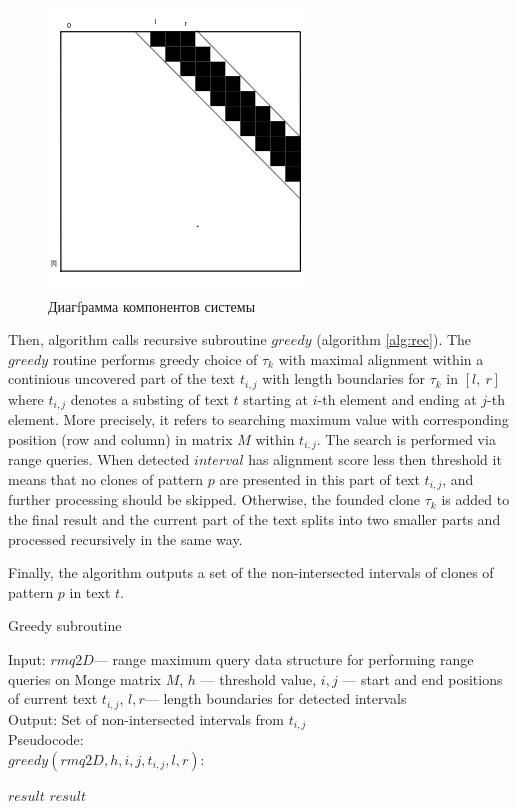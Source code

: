 \begin{figure}[H]
  \centering
    \includegraphics[width=0.4\columnwidth]{figures/M1.png}
    \caption{Диагfрамма компонентов системы}\label{figures:M2}
\end{figure}

Then, algorithm calls recursive subroutine $greedy$ (algorithm \ref{alg:rec}).
The $greedy$ routine performs greedy choice of $\tau_{k}$ with maximal alignment within a continious uncovered part of the text $t_{i,j}$ with length boundaries for $\tau_{k}$ in $[l,\ r]$ where $t_{i,j}$ denotes a substing of text $t$ starting at $i$-th element and ending at $j$-th element.
More precisely, it refers to searching maximum value with corresponding position (row and column) in matrix $M$ within $t_{i,j}$.
The search is performed via range queries.
When detected $interval$ has alignment score less then threshold it means that no clones of pattern $p$ are presented in this part of text $t_{i,j}$, and further processing should be skipped.
Otherwise, the founded clone $\tau_k$ is added to the final result and the current part of the text splits into two smaller parts and processed recursively in the same way.

Finally, the algorithm outputs a set of the non-intersected intervals of clones of pattern $p$ in text $t$.


\begin{algorithm}[H]
\caption{Greedy subroutine}
\label{alg:rec}
Input: $rmq2D$--- range maximum query data structure for performing range queries on Monge matrix $M$, $h$ --- threshold value, $i,j$ --- start and end positions of current text $t_{i,j}$, $l,r$--- length boundaries for detected intervals \\
Output: Set of non-intersected intervals from $t_{i,j}$\\
Pseudocode:\\
$greedy(rmq2D,h, i, j, t_{i,j},l,r ):$

\begin{algorithmic}[1]
\RETURN $result$
\ENDIF
{}
\ENDIF
{}
\ENDIF
\RETURN $result$
\end{algorithmic}
\end{algorithm}


